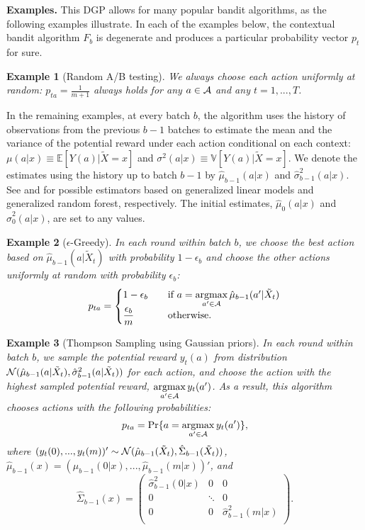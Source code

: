 \documentclass[letterpaper]{article} \usepackage{aaai19}  \usepackage{times}  \usepackage{helvet}  \usepackage{courier}  \usepackage{url}  \usepackage{graphicx}  \frenchspacing  \usepackage{comment}
\newtheorem{example}{Example}
\newcommand{\argmax}{\mathop{\rm argmax}\limits}
\newcommand{\citet}[1]
{\citeauthor{#1} \shortcite{#1}}
\begin{document}
\textbf{Examples.} This DGP allows for many popular bandit algorithms, as the following examples illustrate. 
In each of the examples below, the contextual bandit algorithm $F_b$ is degenerate and produces a particular probability vector $p_t$ for sure. 

\begin{example}[Random A/B testing]\label{ex:A/B}
	We always choose each action uniformly at random: $p_{ta}=\frac{1}{m+1}$ always holds for any $a\in{\cal A}$ and any $t=1,...,T$.
\end{example}

In the remaining examples, at every batch $b$, the algorithm uses the history of observations from the previous $b-1$ batches to estimate the mean and the variance of the potential reward under each action conditional on each context: $\mu(a|x)\equiv\mathbb E[Y(a)|\tilde X=x]$ and $\sigma^2(a|x)\equiv\mathbb V[Y(a)|\tilde X=x]$.
We denote the estimates using the history up to batch $b-1$ by $\hat \mu_{b-1}(a|x)$ and $\hat \sigma^2_{b-1}(a|x)$. 
See \citet{Li2012} and \citet{Dimakopoulou2017} for possible estimators based on generalized linear models and generalized random forest, respectively.
The initial estimates, $\hat \mu_{0}(a|x)$ and $\hat \sigma^2_{0}(a|x)$, are set to any values. 


\begin{example}[$\epsilon$-Greedy]\label{ex:e-greedy}
	In each round within batch $b$, we choose the best action based on $\hat \mu_{b-1}(a|\tilde X_t)$ with probability $1-\epsilon_b$ and choose the other actions uniformly at random with probability $\epsilon_b$:
	$$
	p_{ta}= \begin{cases}
	1-\epsilon_b & \ \ \ \text{if $a=\argmax_{a'\in {\cal A}}\hat \mu_{b-1}(a'|\tilde X_t)$}\\
	\dfrac{\epsilon_b}{m} & \ \ \ \text{otherwise}.
	\end{cases}
	$$
\end{example}



\begin{example}[Thompson Sampling using Gaussian priors]\label{ex:Thompson}
	In each round within batch $b$, we sample the potential reward $y_t(a)$ from distribution ${\cal N}(\hat \mu_{b-1}(a|\tilde X_t),\hat \sigma^2_{b-1}(a|\tilde X_t))$ for each action, and choose the action with the highest sampled potential reward, $\argmax_{a'\in {\cal A}}y_t(a')$.
	As a result, this algorithm chooses actions with the following probabilities:
	$$
	p_{ta} = \Pr\{a=\argmax_{a'\in {\cal A}}y_t(a')\},
	$$
	where $(y_t(0),...,y_t(m))'\sim {\cal N}(\hat \mu_{b-1}(\tilde X_t),\hat \Sigma_{b-1}(\tilde X_t))$, $\hat \mu_{b-1}(x)=(\hat \mu_{b-1}(0|x),...,\hat \mu_{b-1}(m|x))'$, and
	$$
	\hat \Sigma_{b-1}(x)=
	\begin{pmatrix}
	\hat \sigma^2_{b-1}(0|x) & 0 & 0\\
	0 & \ddots & 0 \\
	0 & 0 & \hat \sigma^2_{b-1}(m|x) \\
	\end{pmatrix}.
	$$
\end{example}
\end{document}
